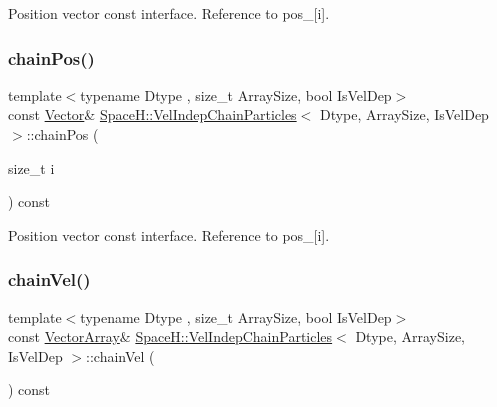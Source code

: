 Position vector const interface. Reference to pos\+\_\+\mbox{[}i\mbox{]}. 

\mbox{\label{class_space_h_1_1_vel_indep_chain_particles_a1d1f6b6ed5e916f84e6502d98773ed13}} 
\subsubsection{\texorpdfstring{chain\+Pos()}{chainPos()}\hspace{0.1cm}{\footnotesize\ttfamily [4/4]}}
{\footnotesize\ttfamily template$<$typename Dtype , size\+\_\+t Array\+Size, bool Is\+Vel\+Dep$>$ \\
const \mbox{\hyperlink{class_space_h_1_1_vel_indep_particles_a61bbcfdb0dc7f99f3c68af69a755c935}{Vector}}\& \mbox{\hyperlink{class_space_h_1_1_vel_indep_chain_particles}{Space\+H\+::\+Vel\+Indep\+Chain\+Particles}}$<$ Dtype, Array\+Size, Is\+Vel\+Dep $>$\+::chain\+Pos (\begin{DoxyParamCaption}\item[{size\+\_\+t}]{i }\end{DoxyParamCaption}) const\hspace{0.3cm}{\ttfamily [inline]}}



Position vector const interface. Reference to pos\+\_\+\mbox{[}i\mbox{]}. 

\mbox{\label{class_space_h_1_1_vel_indep_chain_particles_a741064afd96c861eac50e8de239eedaa}} 
\subsubsection{\texorpdfstring{chain\+Vel()}{chainVel()}\hspace{0.1cm}{\footnotesize\ttfamily [1/4]}}
{\footnotesize\ttfamily template$<$typename Dtype , size\+\_\+t Array\+Size, bool Is\+Vel\+Dep$>$ \\
const \mbox{\hyperlink{class_space_h_1_1_vel_indep_particles_aa9983058940249df8b00fa800e8cbad2}{Vector\+Array}}\& \mbox{\hyperlink{class_space_h_1_1_vel_indep_chain_particles}{Space\+H\+::\+Vel\+Indep\+Chain\+Particles}}$<$ Dtype, Array\+Size, Is\+Vel\+Dep $>$\+::chain\+Vel (\begin{DoxyParamCaption}{ }\end{DoxyParamCaption}) const\hspace{0.3cm}{\ttfamily [inline]}}



